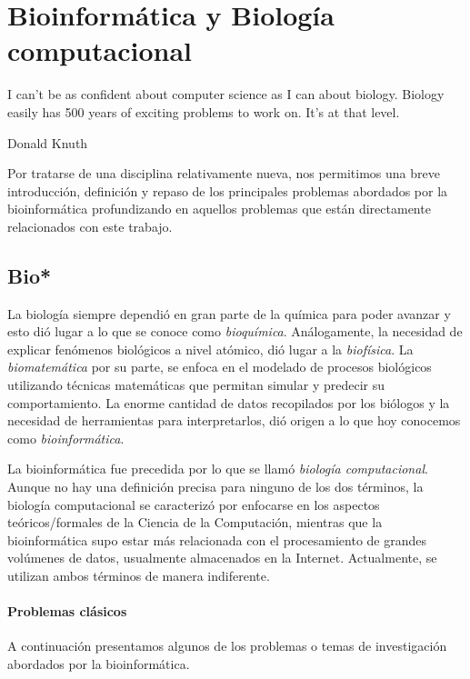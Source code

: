 \chapter{Bioinform\'atica y Biolog\'ia computacional}
\label{bioinformatica}
\epigraph{I can't be as confident about computer science as I can about biology.
Biology easily has 500 years of exciting problems to work on. It's at that
level.}%
{Donald Knuth}

Por tratarse de una disciplina relativamente nueva, nos permitimos una breve
introducci\'on, definici\'on y repaso de los principales problemas abordados
por la bioinform\'atica profundizando en aquellos problemas que est\'an
directamente relacionados con este trabajo.

\section{Bio*}

La biolog\'ia siempre dependi\'o en gran parte de la qu\'imica para poder
avanzar y esto di\'o lugar a lo que se conoce como \textit{bioqu\'imica}.
An\'alogamente, la necesidad de explicar fen\'omenos biol\'ogicos a nivel
at\'omico, di\'o lugar a la \textit{biof\'isica}. La \textit{biomatem\'atica}
por su parte, se enfoca en el modelado de procesos biol\'ogicos utilizando
t\'ecnicas matem\'aticas que permitan simular y predecir su comportamiento. La
enorme cantidad de datos recopilados por los bi\'ologos y la necesidad de
herramientas para interpretarlos, di\'o origen a lo que hoy conocemos como
\textit{bioinform\'atica}.

La bioinform\'atica fue precedida por lo que se llam\'o \textit{biolog\'ia
computacional}. Aunque no hay una definici\'on precisa para ninguno de
los dos t\'erminos, la biolog\'ia computacional se caracteriz\'o por enfocarse
en los aspectos te\'oricos/formales de la Ciencia de la Computaci\'on,
mientras que la bioinform\'atica supo estar m\'as relacionada con el
procesamiento de grandes vol\'umenes de datos, usualmente almacenados en la
Internet. Actualmente, se utilizan ambos t\'erminos de manera indiferente.

\subsubsection{Problemas cl\'asicos}

A continuaci\'on presentamos algunos de los problemas o temas de investigaci\'on
abordados por la bioinform\'atica.

